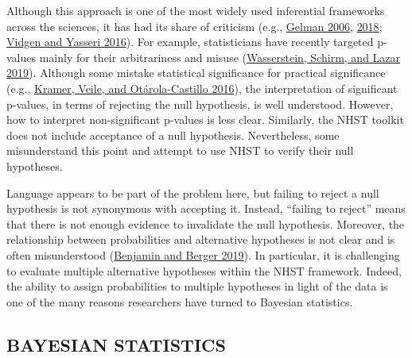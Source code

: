 \documentclass[
]{article}
\begin{document}
Although this approach is one of the most widely used inferential
frameworks across the sciences, it has had its share of criticism (e.g.,
\protect\hyperlink{ref-gelman_multilevel_2006}{Gelman 2006},
\protect\hyperlink{ref-gelman_failure_2018}{2018};
\protect\hyperlink{ref-vidgen_p-values_2016}{Vidgen and Yasseri 2016}).
For example, statisticians have recently targeted p-values mainly for
their arbitrariness and misuse
(\protect\hyperlink{ref-wasserstein_moving_2019}{Wasserstein, Schirm,
and Lazar 2019}). Although some mistake statistical significance for
practical significance (e.g.,
\protect\hyperlink{ref-kramer_sibling_2016}{Kramer, Veile, and
Otárola-Castillo 2016}), the interpretation of significant p-values, in
terms of rejecting the null hypothesis, is well understood. However, how
to interpret non-significant p-values is less clear. Similarly, the NHST
toolkit does not include acceptance of a null hypothesis. Nevertheless,
some misunderstand this point and attempt to use NHST to verify their
null hypotheses.

Language appears to be part of the problem here, but failing to reject a
null hypothesis is not synonymous with accepting it. Instead, ``failing
to reject'' means that there is not enough evidence to invalidate the
null hypothesis. Moreover, the relationship between probabilities and
alternative hypotheses is not clear and is often misunderstood
(\protect\hyperlink{ref-benjamin_three_2019}{Benjamin and Berger 2019}).
In particular, it is challenging to evaluate multiple alternative
hypotheses within the NHST framework. Indeed, the ability to assign
probabilities to multiple hypotheses in light of the data is one of the
many reasons researchers have turned to Bayesian statistics.

\hypertarget{bayesian-statistics}{%
\subsection{BAYESIAN STATISTICS}\label{bayesian-statistics}}
\end{document}
